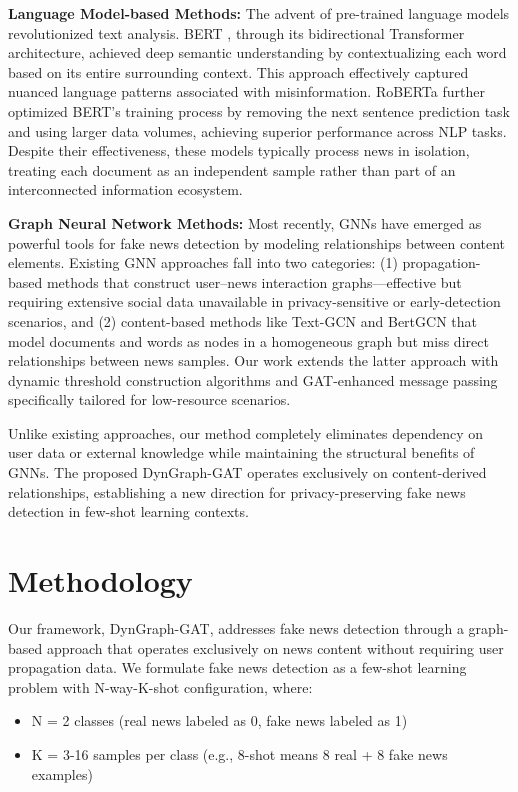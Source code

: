 \documentclass[conference]{IEEEtran}
\begin{document}
\textbf{Language Model-based Methods:} The advent of pre-trained language models revolutionized text analysis. BERT \cite{DBLP:journals/corr/abs-1810-04805}, through its bidirectional Transformer architecture, achieved deep semantic understanding by contextualizing each word based on its entire surrounding context. This approach effectively captured nuanced language patterns associated with misinformation. RoBERTa further optimized BERT's training process by removing the next sentence prediction task and using larger data volumes, achieving superior performance across NLP tasks. Despite their effectiveness, these models typically process news in isolation, treating each document as an independent sample rather than part of an interconnected information ecosystem.

\textbf{Graph Neural Network Methods:} Most recently, GNNs have emerged as powerful tools for fake news detection by modeling relationships between content elements. Existing GNN approaches fall into two categories: (1) propagation-based methods that construct user--news interaction graphs---effective but requiring extensive social data unavailable in privacy-sensitive or early-detection scenarios, and (2) content-based methods like Text-GCN and BertGCN that model documents and words as nodes in a homogeneous graph but miss direct relationships between news samples. Our work extends the latter approach with dynamic threshold construction algorithms and GAT-enhanced message passing specifically tailored for low-resource scenarios.

Unlike existing approaches, our method completely eliminates dependency on user data or external knowledge while maintaining the structural benefits of GNNs. The proposed DynGraph-GAT operates exclusively on content-derived relationships, establishing a new direction for privacy-preserving fake news detection in few-shot learning contexts.


\section{Methodology}
\label{sec:methodology}

Our framework, DynGraph-GAT, addresses fake news detection through a graph-based approach that operates exclusively on news content without requiring user propagation data. We formulate fake news detection as a few-shot learning problem with N-way-K-shot configuration, where:
\begin{itemize}
    \item N = 2 classes (real news labeled as 0, fake news labeled as 1)
    \item K = 3-16 samples per class (e.g., 8-shot means 8 real + 8 fake news examples)
\end{itemize}
\end{document}
